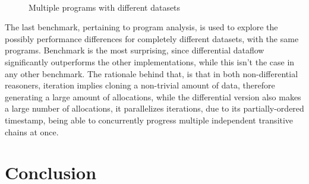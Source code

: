 \documentclass[sigconf,screen,review,natbib]{acmart}
\theoremstyle{definition}
\begin{document}
\begin{figure}[ht]
	\centering
	\\
	\caption{Multiple programs with different datasets}
	\label{benchmark:scalability}
\end{figure}

The last benchmark, pertaining to program analysis, is used to explore the possibly performance differences for completely different datasets, with the same programs. Benchmark \cite{benchmark:csda} is the most surprising, since differential dataflow significantly outperforms the other implementations, while this isn't the case in any other benchmark. The rationale behind that, is that in both non-differential reasoners, iteration implies cloning a non-trivial amount of data, therefore generating a large amount of allocations, while the differential version also makes a large number of allocations, it parallelizes iterations, due to its partially-ordered timestamp, being able to concurrently progress multiple independent transitive chains at once.

\section{Conclusion}
\end{document}
